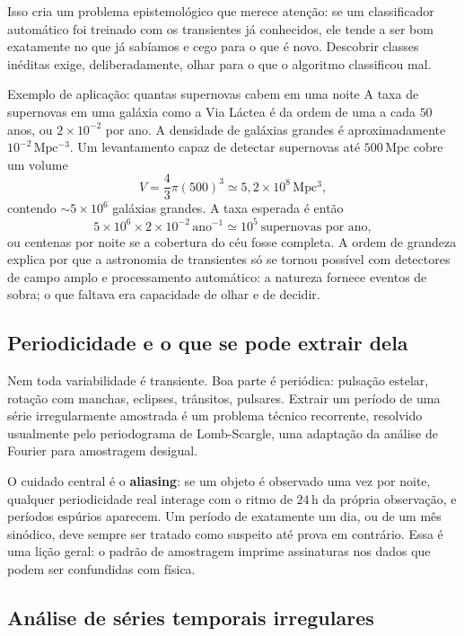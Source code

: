 \documentclass[11pt,a4paper]{article}
\begin{document}
Isso cria um problema epistemológico que merece atenção: se um classificador automático foi treinado com os transientes já conhecidos, ele tende a ser bom exatamente no que já sabíamos e cego para o que é novo. Descobrir classes inéditas exige, deliberadamente, olhar para o que o algoritmo classificou mal.

\begin{lessonblock}{Exemplo de aplicação: quantas supernovas cabem em uma noite}
A taxa de supernovas em uma galáxia como a Via Láctea é da ordem de uma a cada $50$ anos, ou $2\times10^{-2}$ por ano. A densidade de galáxias grandes é aproximadamente $10^{-2}\,\mathrm{Mpc^{-3}}$. Um levantamento capaz de detectar supernovas até $500\,\mathrm{Mpc}$ cobre um volume
\[
V=\frac{4}{3}\pi(500)^3\simeq5{,}2\times10^{8}\,\mathrm{Mpc^3},
\]
contendo $\sim5\times10^{6}$ galáxias grandes. A taxa esperada é então
\[
5\times10^{6}\times2\times10^{-2}\,\mathrm{ano^{-1}}\simeq10^{5}\ \text{supernovas por ano},
\]
ou centenas por noite se a cobertura do céu fosse completa. A ordem de grandeza explica por que a astronomia de transientes só se tornou possível com detectores de campo amplo e processamento automático: a natureza fornece eventos de sobra; o que faltava era capacidade de olhar e de decidir.
\end{lessonblock}

\subsection*{Periodicidade e o que se pode extrair dela}

Nem toda variabilidade é transiente. Boa parte é periódica: pulsação estelar, rotação com manchas, eclipses, trânsitos, pulsares. Extrair um período de uma série irregularmente amostrada é um problema técnico recorrente, resolvido usualmente pelo periodograma de Lomb-Scargle, uma adaptação da análise de Fourier para amostragem desigual.

O cuidado central é o \textbf{aliasing}: se um objeto é observado uma vez por noite, qualquer periodicidade real interage com o ritmo de $24\,\mathrm{h}$ da própria observação, e períodos espúrios aparecem. Um período de exatamente um dia, ou de um mês sinódico, deve sempre ser tratado como suspeito até prova em contrário. Essa é uma lição geral: o padrão de amostragem imprime assinaturas nos dados que podem ser confundidas com física.

\subsection*{Análise de séries temporais irregulares}
\end{document}
